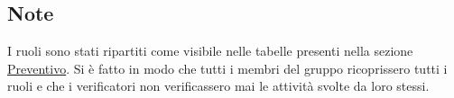 \documentclass[a4paper, titlepage]{article}
\begin{document}
\subsection{Note}
I ruoli sono stati ripartiti come visibile nelle tabelle presenti nella sezione \hyperref[Preventivo]{Preventivo}. Si è fatto in modo che tutti i membri del gruppo ricoprissero tutti i ruoli e che i verificatori non verificassero mai le attività svolte da loro stessi.
\end{document}
